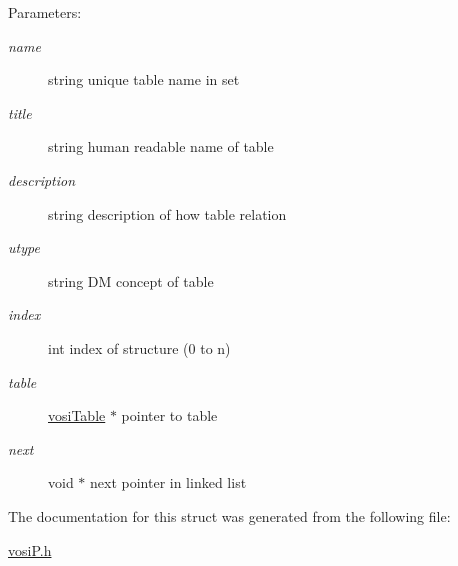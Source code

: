 \begin{Desc}
\item[Parameters:]
\begin{description}
\item[{\em name}]string unique table name in set \item[{\em title}]string human readable name of table \item[{\em description}]string description of how table relation \item[{\em utype}]string DM concept of table \item[{\em index}]int index of structure (0 to n) \item[{\em table}]\hyperlink{structvosiTable}{vosiTable} $\ast$ pointer to table \item[{\em next}]void $\ast$ next pointer in linked list \end{description}
\end{Desc}


The documentation for this struct was generated from the following file:\begin{CompactItemize}
\item 
\hyperlink{vosiP_8h}{vosiP.h}\end{CompactItemize}
